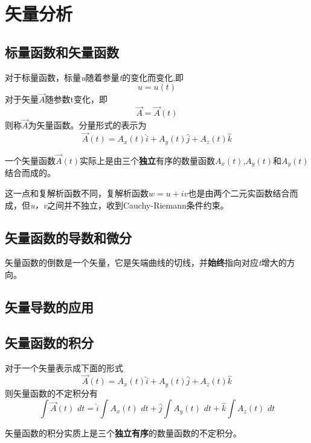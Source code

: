 \chapter{矢量分析}
\section{标量函数和矢量函数}
对于标量函数，标量\textit{u}随着参量\textit{t}的变化而变化,即
\[u=u(t)\]
\noindent
对于矢量$\vec{A}$随参数t变化，即
\[
\vec{A}=\vec{A}\left(t\right)
\]
则称$\vec{A}$为矢量函数。分量形式的表示为
\[
\vec{A}\left(t\right)=A_x\left( t \right) \hat{i}+A_y\left( t \right) \hat{j}+A_z\left( t \right) \hat{k}
\]


\begin{newdef}[]
	一个矢量函数$\vec{A}\left(t\right)$实际上是由三个\textbf{独立}有序的数量函数$A_x\left(t\right)$,$A_y\left(t\right)$和$A_y\left(t\right)$结合而成的。
	
	这一点和复解析函数不同，复解析函数$w=u+\textit{i}v$也是由两个二元实函数结合而成，但\textit{u，v}之间并不独立，收到Cauchy-Riemann条件约束。
\end{newdef}

\section{矢量函数的导数和微分}

\begin{newdef}[]
	矢量函数的倒数是一个矢量，它是矢端曲线的切线，并\textbf{始终}指向对应\textit{t}增大的方向。
\end{newdef}



\section{矢量导数的应用}
	
	
\section{矢量函数的积分}
对于一个矢量表示成下面的形式
	\[
	\vec{A}\left(t\right)=A_x\left( t \right) \hat{i}+A_y\left( t \right) \hat{j}+A_z\left( t \right) \hat{k}
	\]
	则矢量函数的不定积分有
	\[
	\int{\vec{A}\left( t \right)}\,\,\mathit{d}t=\hat{i}\int{A_x\left( t \right)}\,\,\mathit{d}t+\hat{j}\int{A_y\left( t \right)}\,\,\mathit{d}t+\hat{k}\int{A_z\left( t \right)}\,\,\mathit{d}t
	\]
\begin{newdef}[]
	矢量函数的积分实质上是三个\textbf{独立有序}的数量函数的不定积分。
\end{newdef}

